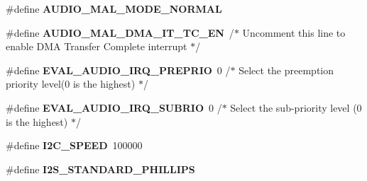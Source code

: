 \begin{DoxyCompactItemize}
\item 
\#define {\bfseries A\-U\-D\-I\-O\-\_\-\-M\-A\-L\-\_\-\-M\-O\-D\-E\-\_\-\-N\-O\-R\-M\-A\-L}
\item 
\hypertarget{group___s_t_m32_f4___d_i_s_c_o_v_e_r_y___a_u_d_i_o___c_o_d_e_c___exported___constants_ga53bef2c200e7ee80706ef5e5f26155ce}{\#define {\bfseries A\-U\-D\-I\-O\-\_\-\-M\-A\-L\-\_\-\-D\-M\-A\-\_\-\-I\-T\-\_\-\-T\-C\-\_\-\-E\-N}~/$\ast$ Uncomment this line to enable D\-M\-A Transfer Complete interrupt $\ast$/}\label{group___s_t_m32_f4___d_i_s_c_o_v_e_r_y___a_u_d_i_o___c_o_d_e_c___exported___constants_ga53bef2c200e7ee80706ef5e5f26155ce}

\item 
\hypertarget{group___s_t_m32_f4___d_i_s_c_o_v_e_r_y___a_u_d_i_o___c_o_d_e_c___exported___constants_ga2f54041f22bd27e0bed14ff446ae64f7}{\#define {\bfseries E\-V\-A\-L\-\_\-\-A\-U\-D\-I\-O\-\_\-\-I\-R\-Q\-\_\-\-P\-R\-E\-P\-R\-I\-O}~0   /$\ast$ Select the preemption priority level(0 is the highest) $\ast$/}\label{group___s_t_m32_f4___d_i_s_c_o_v_e_r_y___a_u_d_i_o___c_o_d_e_c___exported___constants_ga2f54041f22bd27e0bed14ff446ae64f7}

\item 
\hypertarget{group___s_t_m32_f4___d_i_s_c_o_v_e_r_y___a_u_d_i_o___c_o_d_e_c___exported___constants_ga6964260bbcfac5a95fe7fff5ab4a690c}{\#define {\bfseries E\-V\-A\-L\-\_\-\-A\-U\-D\-I\-O\-\_\-\-I\-R\-Q\-\_\-\-S\-U\-B\-R\-I\-O}~0   /$\ast$ Select the sub-\/priority level (0 is the highest) $\ast$/}\label{group___s_t_m32_f4___d_i_s_c_o_v_e_r_y___a_u_d_i_o___c_o_d_e_c___exported___constants_ga6964260bbcfac5a95fe7fff5ab4a690c}

\item 
\hypertarget{group___s_t_m32_f4___d_i_s_c_o_v_e_r_y___a_u_d_i_o___c_o_d_e_c___exported___constants_ga410dc1e7572425a449b5dc0f7ca9f69d}{\#define {\bfseries I2\-C\-\_\-\-S\-P\-E\-E\-D}~100000}\label{group___s_t_m32_f4___d_i_s_c_o_v_e_r_y___a_u_d_i_o___c_o_d_e_c___exported___constants_ga410dc1e7572425a449b5dc0f7ca9f69d}

\item 
\hypertarget{group___s_t_m32_f4___d_i_s_c_o_v_e_r_y___a_u_d_i_o___c_o_d_e_c___exported___constants_ga589f7a2d1f758277adfd369c2a3e4188}{\#define {\bfseries I2\-S\-\_\-\-S\-T\-A\-N\-D\-A\-R\-D\-\_\-\-P\-H\-I\-L\-L\-I\-P\-S}}\label{group___s_t_m32_f4___d_i_s_c_o_v_e_r_y___a_u_d_i_o___c_o_d_e_c___exported___constants_ga589f7a2d1f758277adfd369c2a3e4188}


\end{DoxyCompactItemize}
